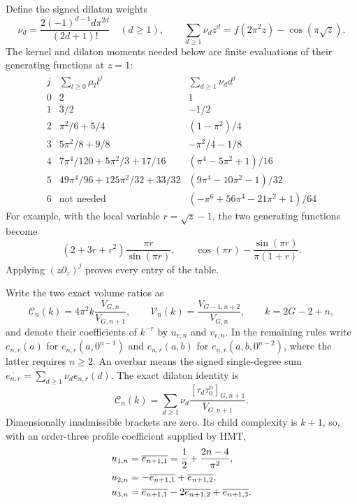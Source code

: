 Define the signed dilaton weights
\begin{equation}\label{eq:a:dilaton-weights}
 \nu_d=\frac{2(-1)^{d-1}d\pi^{2d}}{(2d+1)!}\quad(d\geq1),\qquad
 \sum_{d\geq1}\nu_d z^d
   =f(2\pi^2z)-\cos(\pi\sqrt z).
\end{equation}
The kernel and dilaton moments needed below are finite evaluations of
their generating functions at $z=1$:
\begin{equation}\label{eq:a:finite-moments}
\begin{array}{c|c|c}
 j&\sum_{l\geq0}\mu_l l^j&\sum_{d\geq1}\nu_d d^j\\\hline
0&2&1\\
1&3/2&-1/2\\
2&\pi^2/6+5/4&(1-\pi^2)/4\\
3&5\pi^2/8+9/8&-\pi^2/4-1/8\\
4&7\pi^4/120+5\pi^2/3+17/16&(\pi^4-5\pi^2+1)/16\\
5&49\pi^4/96+125\pi^2/32+33/32&(9\pi^4-10\pi^2-1)/32\\
6&\text{not needed}&(-\pi^6+56\pi^4-21\pi^2+1)/64
\end{array}
\end{equation}
For example, with the local variable $r=\sqrt z-1$, the two generating
functions become
\[
 (2+3r+r^2)\frac{\pi r}{\sin(\pi r)},\qquad
 \cos(\pi r)-\frac{\sin(\pi r)}{\pi(1+r)}.
\]
Applying $(z\partial_z)^j$ proves every entry of the table.

Write the two exact volume ratios as
\begin{equation}\label{eq:a:local-ratios}
 \mathcal C_n(k)=4\pi^2 k\frac{V_{G,n}}{V_{G,n+1}},\qquad
 \mathcal V_n(k)=\frac{V_{G-1,n+2}}{V_{G,n}},
 \qquad k=2G-2+n,
\end{equation}
and denote their coefficients of $k^{-r}$ by $u_{r,n}$ and $v_{r,n}$.
In the remaining rules write $e_{n,r}(a)$ for
$e_{n,r}(a,0^{n-1})$ and $e_{n,r}(a,b)$ for
$e_{n,r}(a,b,0^{n-2})$, where the latter requires $n\geq2$.
An overbar means the signed single-degree sum
$\overline{e_{n,r}}=\sum_{d\geq1}\nu_d e_{n,r}(d)$.
The exact dilaton identity is
\begin{equation}\label{eq:a:exact-cusp}
 \mathcal C_n(k)
 =\sum_{d\geq1}\nu_d
       \frac{[\tau_d\tau_0^n]_{G,n+1}}{V_{G,n+1}}.
\end{equation}
Dimensionally inadmissible brackets are zero. Its child complexity is
$k+1$, so, with an order-three profile coefficient supplied by HMT,
\begin{align}
 u_{1,n}&=\overline{e_{n+1,1}}
                 =\frac12+\frac{2n-4}{\pi^2},\notag\\
 u_{2,n}&=-\overline{e_{n+1,1}}+\overline{e_{n+1,2}},\notag\\
 u_{3,n}&=\overline{e_{n+1,1}}-2\overline{e_{n+1,2}}
                                      +\overline{e_{n+1,3}}.
 \label{eq:a:cusp-extraction}
\end{align}

